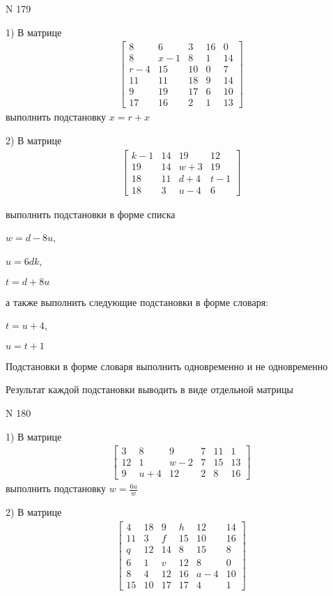 \documentclass[11pt]{report}
\begin{document}
\newpage
N 179


    1) В матрице
\begin{align*}
\left[\begin{matrix}8 & 6 & 3 & 16 & 0\\8 & x - 1 & 8 & 1 & 14\\r - 4 & 15 & 10 & 0 & 7\\11 & 11 & 18 & 9 & 14\\9 & 19 & 17 & 6 & 10\\17 & 16 & 2 & 1 & 13\end{matrix}\right]
\end{align*}
выполнить подстановку $x=r + x$


    2) В матрице
\begin{align*}
\left[\begin{matrix}k - 1 & 14 & 19 & 12\\19 & 14 & w + 3 & 19\\18 & 11 & d + 4 & t - 1\\18 & 3 & u - 4 & 6\end{matrix}\right]
\end{align*}

выполнить подстановки в форме списка

$w=d - 8 u$,

$u=6 d k$,

$t=d + 8 u$

а также выполнить следующие подстановки в форме словаря:

$t=u + 4$,

$u=t + 1$


    Подстановки в форме словаря выполнить одновременно и не одновременно


    Результат каждой подстановки выводить в виде отдельной матрицы

\newpage
N 180


    1) В матрице
\begin{align*}
\left[\begin{matrix}3 & 8 & 9 & 7 & 11 & 1\\12 & 1 & w - 2 & 7 & 15 & 13\\9 & u + 4 & 12 & 2 & 8 & 16\end{matrix}\right]
\end{align*}
выполнить подстановку $w=\frac{6 u}{w}$


    2) В матрице
\begin{align*}
\left[\begin{matrix}4 & 18 & 9 & h & 12 & 14\\11 & 3 & f & 15 & 10 & 16\\q & 12 & 14 & 8 & 15 & 8\\6 & 1 & v & 12 & 8 & 0\\8 & 4 & 12 & 16 & a - 4 & 10\\15 & 10 & 17 & 17 & 4 & 1\end{matrix}\right]
\end{align*}
\end{document}
